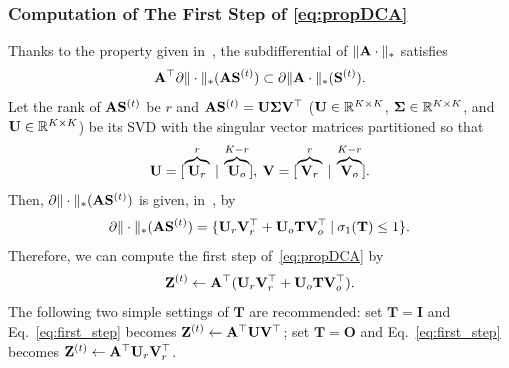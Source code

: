 \documentclass[10pt,journal]{IEEEtran}
\theoremstyle{plain}
\begin{document}
\subsubsection{Computation of The First Step of \eqref{eq:propDCA}}
Thanks to the property given in~\cite[Proposition~16.5 (ii)]{Bauschke2011Convex}, the subdifferential of $\|\mathbf{A}\cdot\|_*$ satisfies
\begin{equation}
\label{eq:subdiff_comp}
    \mathbf{A}^{\top} \partial \|\cdot\|_{*} (\mathbf{A}\mathbf{S}^{(t)}) \subset \partial \|\mathbf{A}\cdot\|_{*}(\mathbf{S}^{(t)}).
\end{equation}
Let the rank of $\mathbf{A}\mathbf{S}^{(t)}$ be $r$ and $\mathbf{A}\mathbf{S}^{(t)} = \mathbf{U}\mathbf{\Sigma}\mathbf{V}^{\top}$ ($\mathbf{U} \in \mathbb{R}^{K\times K}$, $\mathbf{\Sigma} \in \mathbb{R}^{K \times K}$, and $\mathbf{U} \in \mathbb{R}^{K\times K}$) be its SVD with the singular vector matrices partitioned so that 
\begin{equation}
    \mathbf{U} = [\overbrace{\mathbf{U}_{r}}^{r} \: | \: \overbrace{\mathbf{U}_{o}}^{K - r}], \: \mathbf{V} = [\overbrace{\mathbf{V}_{r}}^{r} \: | \: \overbrace{\mathbf{V}_{o}}^{K - r}].
\end{equation}
Then, $\partial \|\cdot\|_{*} (\mathbf{A}\mathbf{S}^{(t)})$ is given, in~\cite[Example~2]{Watson1992Characterization}, by 
\begin{equation}
    \label{eq:subdiff_nuc}
    \partial \|\cdot\|_{*} (\mathbf{A}\mathbf{S}^{(t)}) = \{ \mathbf{U}_{r}\mathbf{V}_{r}^{\top} + \mathbf{U}_{o}\mathbf{T}\mathbf{V}_{o}^{\top} \: | \: \sigma_{1}(\mathbf{T}) \leq 1 \}.
\end{equation}
Therefore, we can compute the first step of~\eqref{eq:propDCA} by
\begin{equation}
    \label{eq:first_step}
    \mathbf{Z}^{(t)} \leftarrow \mathbf{A}^{\top}(\mathbf{U}_{r}\mathbf{V}_{r}^{\top} + \mathbf{U}_{o}\mathbf{T}\mathbf{V}_{o}^{\top}).
\end{equation}
The following two simple settings of $\mathbf{T}$ are recommended: set $\mathbf{T} = \mathbf{I}$ and Eq.~\eqref{eq:first_step} becomes $\mathbf{Z}^{(t)} \leftarrow \mathbf{A}^{\top}\mathbf{U}\mathbf{V}^{\top}$; set $\mathbf{T} = \mathbf{O}$ and Eq.~\eqref{eq:first_step} becomes $\mathbf{Z}^{(t)} \leftarrow \mathbf{A}^{\top}\mathbf{U}_{r}\mathbf{V}_{r}^{\top}$.
\end{document}
